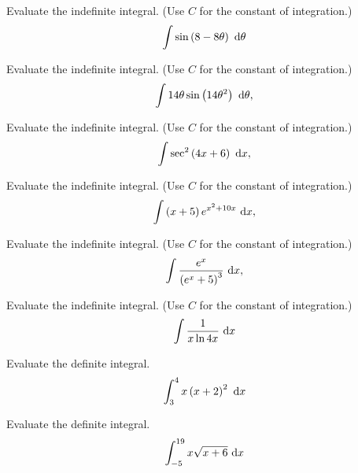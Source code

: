 \documentclass[12pt,addpoints, answers, fleqn]{exam}
\begin{document}
\begin{teacher}
\begin{questions}
Evaluate the indefinite integral. (Use $C$ for the constant of integration.)
\[
\int \sin \left( 8 - 8 \theta \right) \ {\rm{d}} \theta
\]
\begin{solution}
\end{solution}
\question 	%

Evaluate the indefinite integral. (Use $C$ for the constant of integration.)
\[
\int 14 \theta \sin \left( 14 \theta^2\right) \ {\rm{d}} \theta,
\]

\begin{solution}
\end{solution}
\question 	%

Evaluate the indefinite integral. (Use $C$ for the constant of integration.)
\[
\int \sec^2 \left( 4x + 6 \right) \ {\rm{d}} x,
\]

\begin{solution}
\end{solution}
\question 	%

Evaluate the indefinite integral. (Use $C$ for the constant of integration.)
\[
\int \left( x + 5 \right) e^{x^2+10x} \ {\rm{d}} x,
\]
\begin{solution}
\end{solution}

\question 	%

Evaluate the indefinite integral. (Use $C$ for the constant of integration.)
\[
\int \frac{e^x}{\left(e^x+5\right)^3} \ {\rm{d}} x,
\]

\begin{solution}
\end{solution}
\question 	%

Evaluate the indefinite integral. (Use $C$ for the constant of integration.)
\[
\int \frac{1}{x \ln 4x} \ {\rm{d}} x
\]
\begin{solution}
\end{solution}
\question 	%

Evaluate the definite integral.
\[
\int_3^4 x \left( x + 2 \right)^2 \ {\rm{d}} x
\]
\begin{solution}
\end{solution}

\question 	%

Evaluate the definite integral.
\[
\int_{-5}^{19} x \sqrt{x+6} \ {\rm{d}} x
\]
\begin{solution}
\end{solution}
\question 	%


\end{questions}
\end{teacher}
\end{document}
